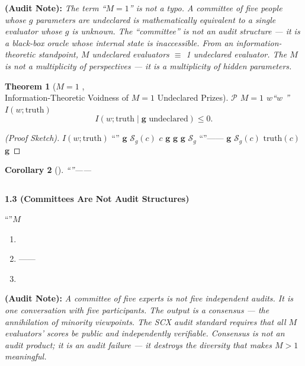 \documentclass[12pt,a4paper]{article}
\newtheorem{theorem}{Theorem}[section]
\newtheorem{corollary}[theorem]{Corollary}
\theoremstyle{remark}
\newcommand{\gaugeVec}{\mathbf{g}}
\newcommand{\scoreOp}{\mathcal{S}}
\newcommand{\prizeSet}{\mathcal{P}}
\newcommand{\auditnote}[1]{%
    \medskip\noindent
    \textbf{ (Audit Note):} \textit{#1}%
}
\begin{document}
\noindent
\auditnote{The term ``$M=1$'' is not a typo. A committee of five people whose $g$ parameters are undeclared is mathematically equivalent to a single evaluator whose $g$ is unknown. The ``committee'' is not an audit structure — it is a black-box oracle whose internal state is inaccessible. From an information-theoretic standpoint, $M$ undeclared evaluators $\equiv$ 1 undeclared evaluator. The $M$ is not a multiplicity of perspectives — it is a multiplicity of hidden parameters.}

\begin{theorem}[$M=1$ , \\
    Information-Theoretic Voidness of $M=1$ Undeclared Prizes]
\label{thm:M1_void}
 $\prizeSet$  $M=1$  $w$``$w$ '' $I(w; \text{truth})$ 
\begin{equation}
    I(w; \text{truth} \mid \gaugeVec \text{ undeclared}) \leq 0.
    \label{eq:info_zero}
\end{equation}
\end{theorem}

\begin{proof}[ (Proof Sketch)]
 $I(w; \text{truth})$ ``'' $\gaugeVec$  $\scoreOp_g(c)$  $c$  $\gaugeVec$  $\gaugeVec$  $\gaugeVec$ $\scoreOp_g$ ``''—— $\gaugeVec$ $\scoreOp_g(c)$  $\text{truth}(c)$  $\gaugeVec$ 
\end{proof}

\begin{corollary}[]
\label{cor:nobel_info}
``''\textit{}——\textit{}
\end{corollary}

\subsection{}

\noindent
\textbf{1.3  (Committees Are Not Audit Structures)}

``''$M$

\begin{enumerate}[label=(\alph*)]
    \item \textbf{}\textit{}\textit{}
    \item \textbf{}——
    \item \textbf{}
\end{enumerate}

\auditnote{A committee of five experts is not five independent audits. It is one conversation with five participants. The output is a consensus — the annihilation of minority viewpoints. The SCX audit standard requires that all $M$ evaluators' scores be public and independently verifiable. Consensus is not an audit product; it is an audit failure — it destroys the diversity that makes $M > 1$ meaningful.}
\end{document}
